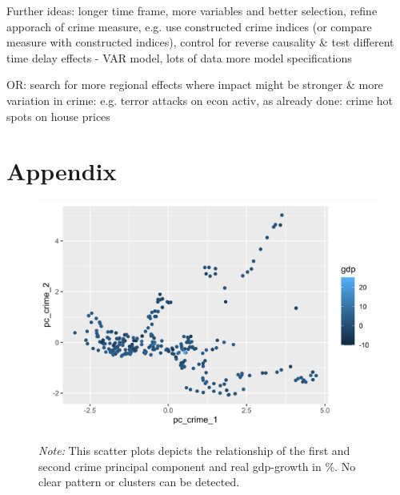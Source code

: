 \documentclass[a4paper,12pt]{article}
\begin{document}
Further ideas: longer time frame, more variables and better selection, refine apporach of crime measure, e.g. use constructed crime indices (or compare measure with constructed indices), control for reverse causality 
\& test different time delay effects - VAR model, lots of data
 more model specifications
 
OR: search for more regional effects where impact might be stronger & more variation in crime: e.g. terror attacks on econ activ,  as already done: crime hot spots on house prices
 
\clearpage


   

\newpage

\section*{Appendix}




\begin{figure}
\begin{minipage}{0.9\textwidth}
  \includegraphics[trim={0 0 0 0},width=\linewidth]{charts/scatter_pca.png}
\begin{flushleft}
\footnotesize{\textit{Note:} This scatter plots depicts the relationship of the first and second crime principal component and real gdp-growth in \%. No clear pattern or clusters can be detected.
\label{fig:scatter_pca}	
}
\end{flushleft}
\end{minipage}
\end{figure}
\end{document}
